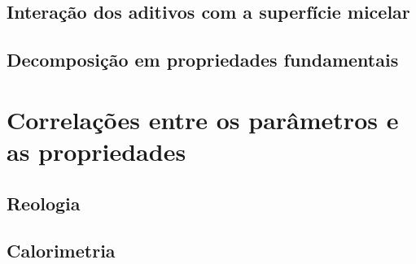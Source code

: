 		\section{Interação dos aditivos com a superfície micelar}
		\section{Decomposição em propriedades fundamentais}
	\chapter{Correlações entre os parâmetros e as propriedades}
		\section{Reologia}
		\section{Calorimetria}
